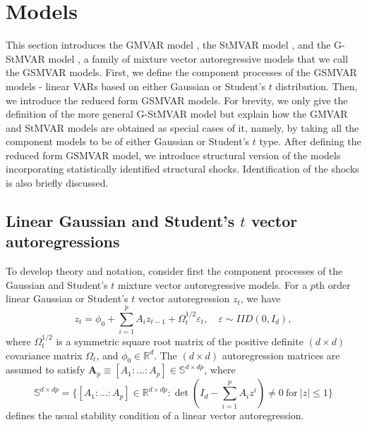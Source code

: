 \documentclass[nojss]{jss} %
\begin{document}
\section{Models}\label{sec:models}
This section introduces the GMVAR model \citep{Kalliovirta+Meitz+Saikkonen:2016}, the StMVAR model \citep{Virolainen2:2021}, and the G-StMVAR model \citep{Virolainen2:2021}, a family of mixture vector autoregressive models that we call the GSMVAR models. First, we define the component processes of the GSMVAR models - linear VARs based on either Gaussian or Student's $t$ distribution. Then, we introduce the reduced form GSMVAR models. For brevity, we only give the definition of the more general G-StMVAR model but explain how the GMVAR and StMVAR models are obtained as special cases of it, namely, by taking all the component models to be of either Gaussian or Student's $t$ type. After defining the reduced form GSMVAR model, we introduce structural version of the models incorporating statistically identified structural shocks. Identification of the shocks is also briefly discussed.

\subsection{Linear Gaussian and Student's $t$ vector autoregressions}\label{sec:linvar}
To develop theory and notation, consider first the component processes of the Gaussian and Student's $t$ mixture vector autoregressive models. For a $p$th order linear Gaussian or Student's $t$ vector autoregression $z_t$, we have
\begin{equation}\label{eq:gaussianvar}
z_t = \phi_{0} + \sum_{i=1}^pA_iz_{t-1} + \Omega_t^{1/2}\varepsilon_t, \quad \varepsilon\sim IID(0,I_d),
\end{equation}
where $\Omega_t^{1/2}$ is a symmetric square root matrix of the positive definite $(d\times d)$ covariance matrix $\Omega_t$, and $\phi_0\in\mathbb{R}^d$. The $(d \times d)$ autoregression matrices are assumed to satisfy $\boldsymbol{A}_p \equiv [A_1:...:A_p]\in\mathbb{S}^{d\times dp}$, where
\begin{equation}\label{eq:statreg}
\mathbb{S}^{d\times dp}= \lbrace [A_1:...:A_p]\in\mathbb{R}^{d\times dp}: \det(I_d - \sum_{i=1}^pA_iz^i)\neq 0 \ \text{for} \ |z|\leq 1 \rbrace
\end{equation}
defines the usual stability condition of a linear vector autoregression.
\end{document}
